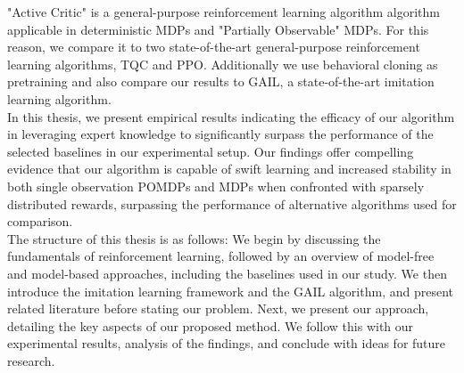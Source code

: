 "Active Critic" is a general-purpose reinforcement learning algorithm algorithm applicable in deterministic MDPs and "Partially Observable" MDPs. 
For this reason, we compare it to two state-of-the-art general-purpose reinforcement learning algorithms, TQC and PPO. Additionally we use behavioral cloning as pretraining  
and also compare our results to GAIL, a state-of-the-art imitation learning algorithm.\\
In this thesis, we present empirical results indicating the efficacy of our algorithm in leveraging expert knowledge to significantly surpass the performance of the selected baselines in our 
experimental setup. Our findings offer compelling evidence that our algorithm is capable of swift learning and increased stability in both single observation POMDPs and MDPs when confronted with 
sparsely distributed rewards, surpassing the performance of alternative algorithms used for comparison.\\

The structure of this thesis is as follows: We begin by discussing the fundamentals of reinforcement learning, followed by an overview of model-free and model-based approaches, 
including the baselines used in our study. We then introduce the imitation learning framework and the GAIL algorithm, and present related literature before stating our problem. 
Next, we present our approach, detailing the key aspects of our proposed method. We follow this with our experimental results, analysis of the findings, and conclude with ideas for future research.